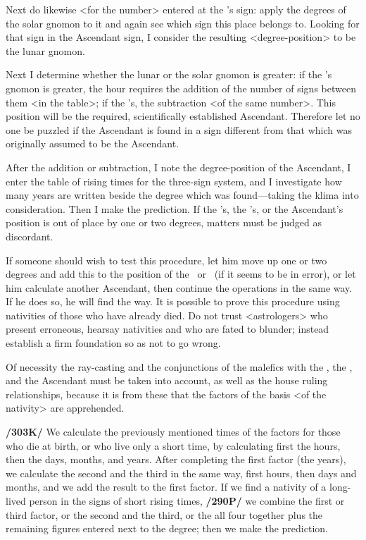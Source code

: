 Next do likewise <for the number> entered at the \Moon’s sign: apply the degrees of the solar gnomon to it and again see which sign this place belongs to. Looking for that sign in the Ascendant sign, I
consider the resulting <degree-position> to be the lunar gnomon.

Next I determine whether the lunar or the solar gnomon is greater: if the \Sun’s gnomon is greater, the hour requires the addition of the number of signs between them <in the table>; if the \Moon’s, the
subtraction <of the same number>. This position will be the required, scientifically established Ascendant. Therefore let no one be puzzled if the Ascendant is found in a sign different from that which was originally assumed to be the Ascendant. 

After the addition or subtraction, I note the degree-position of the
Ascendant, I enter the table of rising times for the three-sign system, and I investigate how many years are written beside the degree which was found—taking the klima into consideration. Then I make the
prediction. If the \Sun’s, the \Moon’s, or the Ascendant’s position is out of place by one or two degrees, matters must be judged as discordant.

If someone should wish to test this procedure, let him move up one or two degrees and add this to the position of the \Sun\, or \Moon\, (if it seems to be in error), or let him calculate another Ascendant, then
continue the operations in the same way. If he does so, he will find the way. It is possible to prove this procedure using nativities of those who have already died. Do not trust <astrologers> who present
erroneous, hearsay nativities and who are fated to blunder; instead establish a firm foundation so as not to go wrong.

Of  necessity the ray-casting and the conjunctions of the malefics with the \Sun, the \Moon, and the Ascendant must be taken into account, as well as the house ruling relationships, because it is from these
that the factors of the basis <of the nativity> are apprehended.

\textbf{/303K/} We calculate the previously mentioned times of the factors for those who die at birth, or who live only a short time, by calculating first the hours, then the days, months, and years. After completing the first factor (the years), we calculate the second and the third in the same way, first hours, then days and months, and we add the result to the first factor. If we find a nativity of a long-lived person in the signs of short rising times, \textbf{/290P/} we combine the first or third factor, or the second and the third, or the all four together plus the remaining figures entered next to the degree; then we make the prediction.

